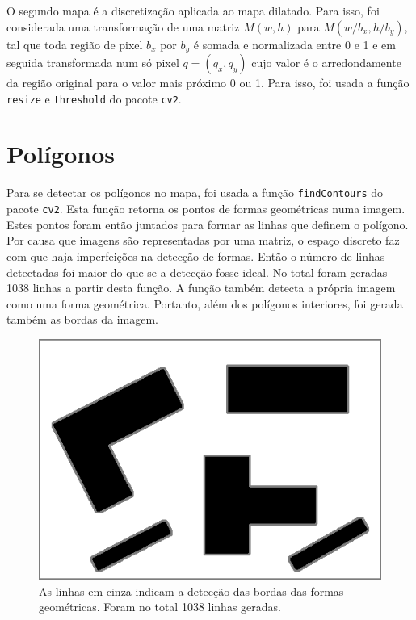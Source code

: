 \documentclass[12pt]{article}
\theoremstyle{plain}
\numberwithin{equation}{section}
\newcommand{\code}[1]{\lstinline[mathescape=true]{#1}}
\begin{document}
O segundo mapa é a discretização aplicada ao mapa dilatado. Para isso, foi considerada uma
transformação de uma matriz $M(w, h)$ para $M(w/b_x, h/b_y)$, tal que toda região de pixel $b_x$
por $b_y$ é somada e normalizada entre 0 e 1 e em seguida transformada num só pixel $q=(q_x, q_y)$
cujo valor é o arredondamente da região original para o valor mais próximo 0 ou 1. Para isso, foi
usada a função \code{resize} e \code{threshold} do pacote \code{cv2}.

\section{Polígonos}

Para se detectar os polígonos no mapa, foi usada a função \code{findContours} do pacote \code{cv2}.
Esta função retorna os pontos de formas geométricas numa imagem. Estes pontos foram então juntados
para formar as linhas que definem o polígono. Por causa que imagens são representadas por uma
matriz, o espaço discreto faz com que haja imperfeições na detecção de formas. Então o número de
linhas detectadas foi maior do que se a detecção fosse ideal. No total foram geradas 1038 linhas a
partir desta função. A função também detecta a própria imagem como uma forma geométrica. Portanto,
além dos polígonos interiores, foi gerada também as bordas da imagem.

\begin{figure}[h]
  \centering\includegraphics[scale=0.6]{imgs/contours.png}
  \caption{As linhas em cinza indicam a detecção das bordas das formas geométricas. Foram no total
    1038 linhas geradas.}
\end{figure}
\end{document}
